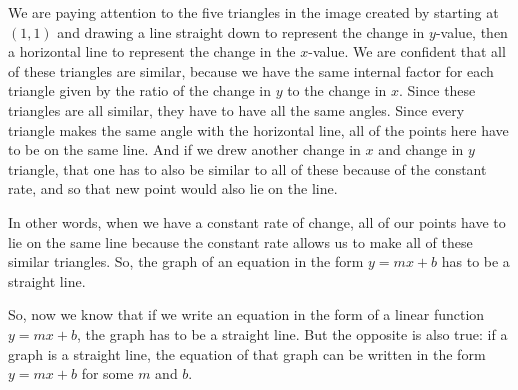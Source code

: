 \documentclass{ximera}
\begin{document}
\begin{example}
\begin{image}
\end{image}
We are paying attention to the five triangles in the image created by starting at $(1,1)$ and drawing a line straight down to represent the change in $y$-value, then a horizontal line to represent the change in the $x$-value. We are confident that all of these triangles are similar, because we have the same internal factor for each triangle given by the ratio of the change in $y$ to the change in $x$. Since these triangles are all similar, they have to have all the same angles. Since every triangle makes the same angle with the horizontal line, all of the points here have to be on the same line. And if we drew another change in $x$ and change in $y$ triangle, that one has to also be similar to all of these because of the constant rate, and so that new point would also lie on the line. 

In other words, when we have a constant rate of change, all of our points have to lie on the same line because the constant rate allows us to make all of these similar triangles. So, the graph of an equation in the form $y=mx+b$ has to be a straight line.
\begin{image}
\end{image}


\end{example}
So, now we know that if we write an equation in the form of a linear function $y=mx+b$, the graph has to be a straight line. But the opposite is also true: if a graph is a straight line, the equation of that graph can be written in the form $y=mx+b$ for some $m$ and $b$. 
\end{document}
